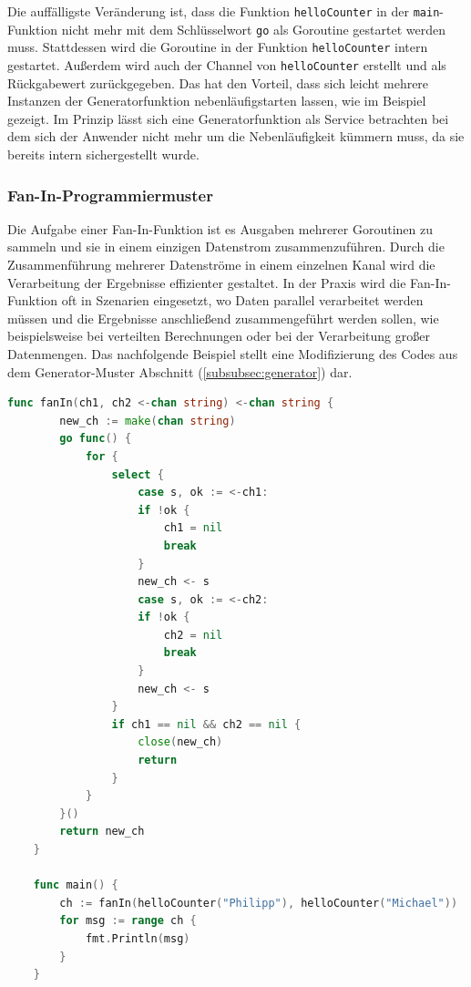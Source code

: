 \documentclass[fontsize=12pt,paper=a4,twoside=semi,parskip=half-,headsepline,headinclude]{scrreprt}
\begin{document}
Die auffälligste Veränderung ist, dass die Funktion \texttt{helloCounter} in der \texttt{main}-Funktion nicht mehr mit dem Schlüsselwort \texttt{go} als Goroutine gestartet werden muss. Stattdessen wird die Goroutine in der Funktion \texttt{helloCounter} intern gestartet. Außerdem wird auch der Channel von \texttt{helloCounter} erstellt und als Rückgabewert zurückgegeben. Das hat den Vorteil, dass sich leicht mehrere Instanzen der Generatorfunktion nebenläufigstarten lassen, wie im Beispiel gezeigt. Im Prinzip lässt sich eine Generatorfunktion als Service betrachten bei dem sich der Anwender nicht mehr um die Nebenläufigkeit kümmern muss, da sie bereits intern sichergestellt wurde.

\subsubsection{Fan-In-Programmiermuster}

Die Aufgabe einer Fan-In-Funktion ist es Ausgaben mehrerer Goroutinen zu sammeln und sie in einem einzigen Datenstrom zusammenzuführen. Durch die Zusammenführung mehrerer Datenströme in einem einzelnen Kanal wird die Verarbeitung der Ergebnisse effizienter gestaltet. In der Praxis wird die Fan-In-Funktion oft in Szenarien eingesetzt, wo Daten parallel verarbeitet werden müssen und die Ergebnisse anschließend zusammengeführt werden sollen, wie beispielsweise bei verteilten Berechnungen oder bei der Verarbeitung großer Datenmengen. Das nachfolgende Beispiel stellt eine Modifizierung des Codes aus dem Generator-Muster Abschnitt (\ref{subsubsec:generator}) dar.

\begin{lstlisting}[language=Go,extendedchars=true]
	func fanIn(ch1, ch2 <-chan string) <-chan string {
		new_ch := make(chan string)
		go func() {
			for {
				select {
					case s, ok := <-ch1:
					if !ok {
						ch1 = nil
						break
					}
					new_ch <- s
					case s, ok := <-ch2:
					if !ok {
						ch2 = nil
						break
					}
					new_ch <- s
				}
				if ch1 == nil && ch2 == nil {
					close(new_ch)
					return
				}
			}
		}()
		return new_ch
	}

	func main() {
		ch := fanIn(helloCounter("Philipp"), helloCounter("Michael"))
		for msg := range ch {
			fmt.Println(msg)
		}
	}
\end{lstlisting}
\end{document}
